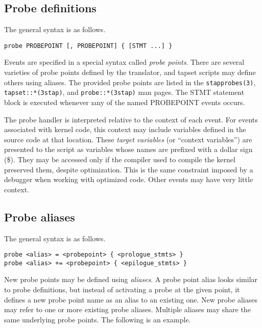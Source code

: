 \documentclass[twoside,english]{article}
\newenvironment{vindent}
{\begin{list}{}{\setlength{\listparindent}{6pt}}
\item[]}
{\end{list}}
\begin{document}
\subsection{Probe definitions}

The general syntax is as follows.

\begin{vindent}
\begin{verbatim}
probe PROBEPOINT [, PROBEPOINT] { [STMT ...] }
\end{verbatim}
\end{vindent}
Events are specified in a special syntax called \emph{probe points}. There
are several varieties of probe points defined by the translator, and tapset
scripts may define others using aliases. The provided probe points are listed
in the \texttt{stapprobes(3)}, \texttt{tapset::*(3stap)}, and
\texttt{probe::*(3stap)} man pages.  The STMT statement block is executed
whenever {\i any} of the named PROBEPOINT events occurs.

The probe handler is interpreted relative to the context of each event. For
events associated with kernel code, this context may include variables defined
in the source code at that location. These \emph{target variables} (or ``context variables'')
are presented to the script as variables whose names are prefixed with a
dollar sign (\$). They may be accessed only if the compiler used to compile
the kernel preserved them, despite optimization. This is the same constraint
imposed by a debugger when working with optimized code. Other events may
have very little context.


\subsection{Probe aliases\label{sub:Probe-aliases}}
The general syntax is as follows.

\begin{vindent}
\begin{verbatim}
probe <alias> = <probepoint> { <prologue_stmts> }
probe <alias> += <probepoint> { <epilogue_stmts> }
\end{verbatim}
\end{vindent}

New probe points may be defined using \emph{aliases}. A probe point alias
looks similar to probe definitions, but instead of activating a probe at
the given point, it defines a new probe point name as an alias to an existing
one. New probe aliases may refer to one or more existing probe aliases.
Multiple aliases may share the same underlying probe points.
The following is an example.
\end{document}
